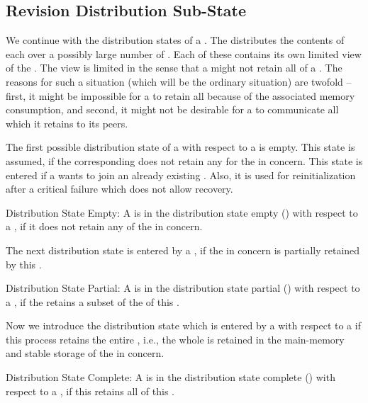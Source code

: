 \documentclass[a4paper, 12pt]{book}
\begin{document}
\subsection{Revision Distribution Sub-State}
\label{sec:revision-states-distribution}

We continue with the distribution states of a . The \SYNEIGHT
distributes the contents of each  over a possibly large number
of . Each of these  contains its own
limited view of the . The view is limited in the sense that a
 might not retain all  of a
. The reasons for such a situation (which will be the
ordinary situation) are twofold -- first, it might be impossible for
a  to retain all  because of the associated
memory consumption, and second, it might not be desirable for a
 to communicate all  which it retains to its
peers. 

The first possible distribution state of a  with respect to a
 is empty. This state is assumed, if the corresponding
 does not retain any  for the 
in concern.
%
This state is entered if a  wants to join an already existing
. Also, it is used for reinitialization
after a critical failure which does not allow recovery.
%
\begin{definition*}{Distribution State Empty: \revdiststateEMPTY}
  A  is in the distribution state empty (\revdiststateEMPTY) with
  respect to a , if it does not retain any  of the
   in concern. 
\end{definition*}
%
The next distribution state is entered by a , if the
 in concern is partially retained by this .
%
\begin{definition*}{Distribution State Partial: \revdiststatePARTIAL}
  A  is in the distribution state partial (\revdiststatePARTIAL) with
  respect to a , if the  retains a subset of the
   of this .
\end{definition*}
%
Now we introduce the distribution state \revdiststateCOMPLETE which is entered
by a  with respect to a  if this process retains the entire
, i.e., the whole  is retained in the main-memory
and stable storage of the  in concern.
%
\begin{definition*}{Distribution State Complete: \revdiststateCOMPLETE}
  A  is in the distribution state complete
  (\revdiststateCOMPLETE) with respect to a , if this 
  retains all  of this .
\end{definition*}
%
\end{document}
